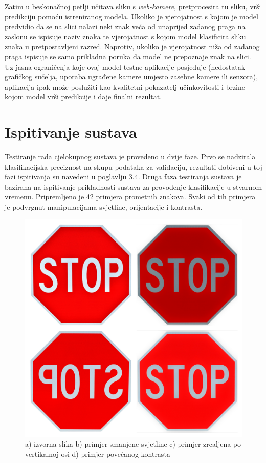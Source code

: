 \documentclass[times, utf8, zavrsni]{fer}
\begin{document}
Zatim u beskonačnoj petlji učitava sliku s \emph{web-kamere}, pretprocesira tu sliku, vrši predikciju pomoću istreniranog modela. Ukoliko je vjerojatnost s kojom je model predvidio da se na slici nalazi neki znak veća od unaprijed zadanog praga na zaslonu se ispisuje naziv
znaka te vjerojatnost s kojom model klasificira sliku znaka u pretpostavljeni razred. Naprotiv, ukoliko je vjerojatnost niža od zadanog praga ispisuje se samo prikladna poruka da model ne prepoznaje znak na slici.
\\Uz jasna ograničenja koje ovaj model testne aplikacije posjeduje (nedostatak grafičkog sučelja, uporaba ugrađene kamere umjesto zasebne kamere ili senzora), aplikacija ipak može poslužiti kao kvalitetni pokazatelj učinkovitosti i brzine kojom model vrši predikcije i daje finalni rezultat. 


\section{Ispitivanje sustava}
Testiranje rada cjelokupnog sustava je provedeno u dvije faze. Prvo se nadzirala klasifikacijska preciznost na skupu podataka za validaciju, rezultati dobiveni u toj fazi ispitivanja su navedeni u poglavlju 3.4. Druga faza testiranja sustava je bazirana na ispitivanje prikladnosti sustava za provođenje klasifikacije u stvarnom vremenu.
Pripremljeno je 42 primjera prometnih znakova. Svaki od tih primjera je podvrgnut manipulacijama svjetline, orijentacije i kontrasta. 
\begin{figure}[h!]
  \includegraphics[width=\linewidth,trim=4 4 4 4,clip]{images/stop_test.jpg}
  \caption{a) izvorna slika
b) primjer smanjene svjetline
c) primjer zrcaljena po vertikalnoj osi
d) primjer povečanog kontrasta
}
\end{figure} 
\end{document}
